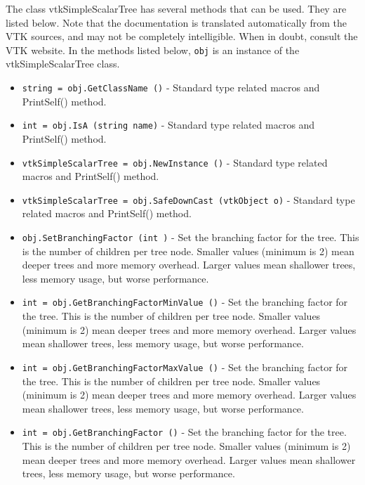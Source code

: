 The class vtkSimpleScalarTree has several methods that can be used.
  They are listed below.
Note that the documentation is translated automatically from the VTK sources,
and may not be completely intelligible.  When in doubt, consult the VTK website.
In the methods listed below, \verb|obj| is an instance of the vtkSimpleScalarTree class.
\begin{itemize}
\item  \verb|string = obj.GetClassName ()| -  Standard type related macros and PrintSelf() method.

\item  \verb|int = obj.IsA (string name)| -  Standard type related macros and PrintSelf() method.

\item  \verb|vtkSimpleScalarTree = obj.NewInstance ()| -  Standard type related macros and PrintSelf() method.

\item  \verb|vtkSimpleScalarTree = obj.SafeDownCast (vtkObject o)| -  Standard type related macros and PrintSelf() method.

\item  \verb|obj.SetBranchingFactor (int )| -  Set the branching factor for the tree. This is the number of
 children per tree node. Smaller values (minimum is 2) mean deeper
 trees and more memory overhead. Larger values mean shallower
 trees, less memory usage, but worse performance.

\item  \verb|int = obj.GetBranchingFactorMinValue ()| -  Set the branching factor for the tree. This is the number of
 children per tree node. Smaller values (minimum is 2) mean deeper
 trees and more memory overhead. Larger values mean shallower
 trees, less memory usage, but worse performance.

\item  \verb|int = obj.GetBranchingFactorMaxValue ()| -  Set the branching factor for the tree. This is the number of
 children per tree node. Smaller values (minimum is 2) mean deeper
 trees and more memory overhead. Larger values mean shallower
 trees, less memory usage, but worse performance.

\item  \verb|int = obj.GetBranchingFactor ()| -  Set the branching factor for the tree. This is the number of
 children per tree node. Smaller values (minimum is 2) mean deeper
 trees and more memory overhead. Larger values mean shallower
 trees, less memory usage, but worse performance.


\end{itemize}
